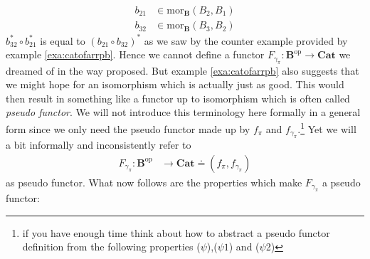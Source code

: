 \begin{align*}
  b_{21}
  &\in
  \mathrm{mor}_{\mathbf{B}}(B_{2},B_{1})
  \\
  b_{32}
  &\in
  \mathrm{mor}_{\mathbf{B}}(B_{3},B_{2})
\end{align*}
$b_{32}^{\ast} \circ b_{21}^{\ast}$ is equal to $(b_{21} \circ b_{32})^{\ast}$ as we saw by the counter example provided by example \ref{exa:catofarrpb}. Hence we cannot define a functor $F_{\gamma_{\pi}} \colon \mathbf{B}^{\mathrm{op}} \rightarrow \mathbf{Cat}$ we dreamed of in the way proposed. But example \ref{exa:catofarrpb} also suggests that we might hope for an isomorphism which is actually just as good. This would then result in something like a functor up to isomorphism which is often called \textit{pseudo functor}. We will not introduce this terminology here formally in a general form since we only need the pseudo functor made up by $f_{\pi}$ and $f_{\gamma_{\pi}}$.\footnote{if you have enough time think about how to abstract a pseudo functor definition from the following properties ($\psi$),($\psi1$) and ($\psi$2)} Yet we will a bit informally and inconsistently refer to
\begin{align*}
  F_{\gamma_{\pi}}
  \colon
  \mathbf{B}^{\mathrm{op}}
  &\rightarrow
  \mathbf{Cat}
  \doteq
  \left(
    f_{\pi},
    f_{\gamma_{\pi}}
  \right)
\end{align*}
as pseudo functor. What now follows are the properties which make $F_{\gamma_{\pi}}$ a pseudo functor:
